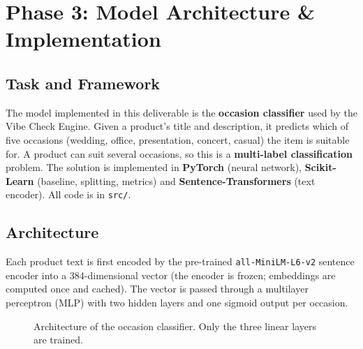 \section{Phase 3: Model Architecture \& Implementation}

\subsection{Task and Framework}
The model implemented in this deliverable is the \textbf{occasion classifier} used by the Vibe Check Engine. Given a product's title and description, it predicts which of five occasions (wedding, office, presentation, concert, casual) the item is suitable for. A product can suit several occasions, so this is a \textbf{multi-label classification} problem. The solution is implemented in \textbf{PyTorch} (neural network), \textbf{Scikit-Learn} (baseline, splitting, metrics) and \textbf{Sentence-Transformers} (text encoder). All code is in \texttt{src/}.

\subsection{Architecture}
Each product text is first encoded by the pre-trained \texttt{all-MiniLM-L6-v2} sentence encoder into a 384-dimensional vector (the encoder is frozen; embeddings are computed once and cached). The vector is passed through a multilayer perceptron (MLP) with two hidden layers and one sigmoid output per occasion.

\begin{figure}[htbp]
\centering
{}
\caption{Architecture of the occasion classifier. Only the three linear layers are trained.}
\end{figure}

